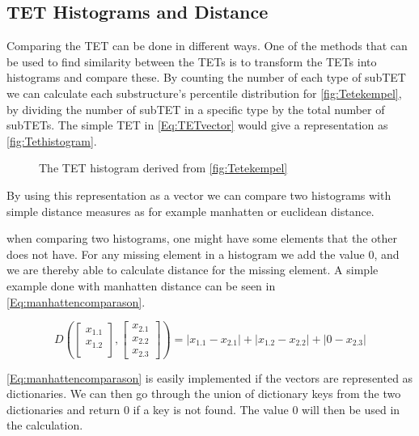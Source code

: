 \subsection{TET Histograms and Distance}
	Comparing the TET can be done in different ways. One of the methods that can be used to find similarity between the TETs is to transform the TETs into histograms and compare these\cite{JAEGER201330}. By counting the number of each type of subTET we can calculate each substructure's percentile distribution for \autoref{fig:Tetekempel}, by dividing the number of subTET in a specific type by the total number of subTETs. The simple TET in \autoref{Eq:TETvector} would give a representation as \autoref{fig:Tethistogram}.
	
	\begin{figure}[H]
		\centering
		\begin{adjustbox}{width=0.5\textwidth}
			
		\end{adjustbox}
		\caption{The TET histogram derived from \autoref{fig:Tetekempel}}
		\label{fig:Tethistogram}
	\end{figure}
	
	By using this representation as a vector we can compare two histograms with simple distance measures as for example manhatten or euclidean distance.
	
	when comparing two histograms, one might have some elements that the other does not have. For any missing element in a histogram we add the value $0$, and we are thereby able to calculate distance for the missing element. A simple example done with manhatten distance can be seen in \autoref{Eq:manhattencomparason}\cite{singh2013k}.
	
	\begin{equation}\label{Eq:manhattencomparason}
	D(\begin{bmatrix}
	x_{1.1} \\
	x_{1.2} \\
	\end{bmatrix},
	\begin{bmatrix}
	x_{2.1} \\
	x_{2.2} \\
	x_{2.3}
	\end{bmatrix})= |x_{1.1} - x_{2.1}| + |x_{1.2} - x_{2.2}| + |0 - x_{2.3}|
	\end{equation}
	
	\autoref{Eq:manhattencomparason} is easily implemented if the vectors are represented as dictionaries. We can then go through the union of dictionary keys from the two dictionaries and return $0$ if a key is not found. The value $0$ will then be used in the calculation. 
